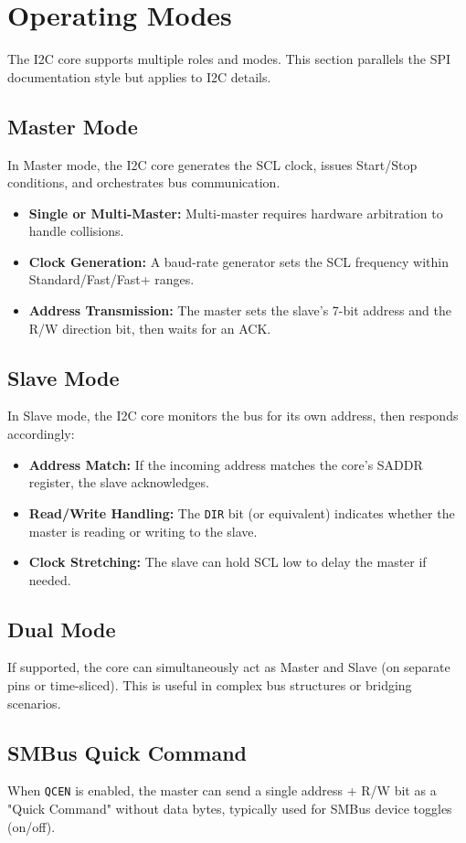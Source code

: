 \section{Operating Modes}

The I2C core supports multiple roles and modes. This section parallels the SPI documentation style but applies to I2C details.

\subsection{Master Mode}
In Master mode, the I2C core generates the SCL clock, issues Start/Stop conditions, and orchestrates bus communication.

\begin{itemize}
    \item \textbf{Single or Multi-Master:} Multi-master requires hardware arbitration to handle collisions.
    \item \textbf{Clock Generation:} A baud-rate generator sets the SCL frequency within Standard/Fast/Fast+ ranges.
    \item \textbf{Address Transmission:} The master sets the slave’s 7-bit address and the R/W direction bit, then waits for an ACK.
\end{itemize}

\subsection{Slave Mode}
In Slave mode, the I2C core monitors the bus for its own address, then responds accordingly:

\begin{itemize}
    \item \textbf{Address Match:} If the incoming address matches the core's SADDR register, the slave acknowledges.
    \item \textbf{Read/Write Handling:} The \texttt{DIR} bit (or equivalent) indicates whether the master is reading or writing to the slave.
    \item \textbf{Clock Stretching:} The slave can hold SCL low to delay the master if needed.
\end{itemize}

\subsection{Dual Mode}
If supported, the core can simultaneously act as Master and Slave (on separate pins or time-sliced). This is useful in complex bus structures or bridging scenarios.

\subsection{SMBus Quick Command}
When \texttt{QCEN} is enabled, the master can send a single address + R/W bit as a "Quick Command" without data bytes, typically used for SMBus device toggles (on/off).

